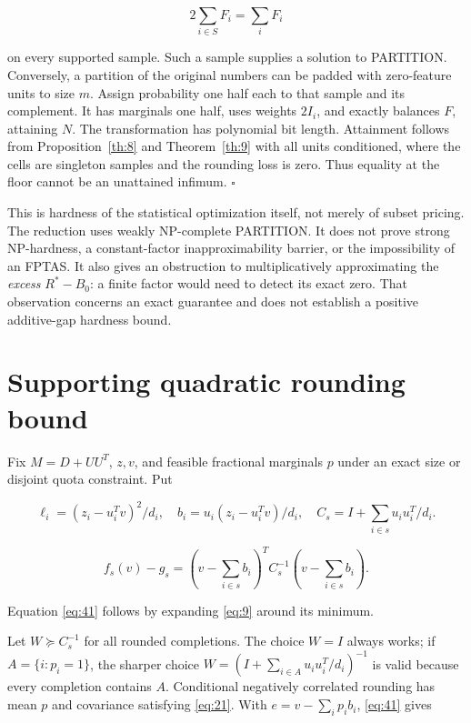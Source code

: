 \documentclass[11pt]{article}
\begin{document}
\[
2\sum_{i\in S}F_i=\sum_iF_i
\]

on every supported sample. Such a sample supplies a solution to
PARTITION. Conversely, a partition of the original numbers can be padded
with zero-feature units to size \(m\). Assign probability one half each
to that sample and its complement. It has marginals one half, uses
weights \(2I_i\), and exactly balances \(F\), attaining \(N\). The
transformation has polynomial bit length. Attainment follows from
Proposition~\ref{th:8} and
Theorem~\ref{th:9} with all units conditioned, where the
cells are singleton samples and the rounding loss is zero. Thus equality
at the floor cannot be an unattained infimum. \(\square\)

This is hardness of the statistical optimization itself, not merely of
subset pricing. The reduction uses weakly NP-complete PARTITION. It does
not prove strong NP-hardness, a constant-factor inapproximability
barrier, or the impossibility of an FPTAS. It also gives an obstruction
to multiplicatively approximating the \emph{excess} \(R^*-B_0\): a
finite factor would need to detect its exact zero. That observation
concerns an exact guarantee and does not establish a positive
additive-gap hardness bound.

\section{Supporting quadratic rounding
bound}\label{supporting-quadratic-rounding-bound}

Fix \(M=D+UU^T\), \(z,v\), and feasible fractional marginals \(p\) under
an exact size or disjoint quota constraint. Put

\[
\ell_i=(z_i-u_i^Tv)^2/d_i,\quad
b_i=u_i(z_i-u_i^Tv)/d_i,\quad
C_s=I+\sum_{i\in s}u_iu_i^T/d_i.
\]

\begin{equation}\label{eq:41}
f_s(v)-g_s=
\left(v-\sum_{i\in s}b_i\right)^T
C_s^{-1}
\left(v-\sum_{i\in s}b_i\right). 
\end{equation}

Equation \eqref{eq:41} follows by expanding \eqref{eq:9} around its
minimum.

Let \(W\succeq C_s^{-1}\) for all rounded completions. The choice
\(W=I\) always works; if \(A=\{i:p_i=1\}\), the sharper choice
\(W=(I+\sum_{i\in A}u_iu_i^T/d_i)^{-1}\) is valid because every
completion contains \(A\). Conditional negatively correlated rounding
has mean \(p\) and covariance satisfying \eqref{eq:21}. With
\(e=v-\sum_i p_ib_i\), \eqref{eq:41} gives
\end{document}
